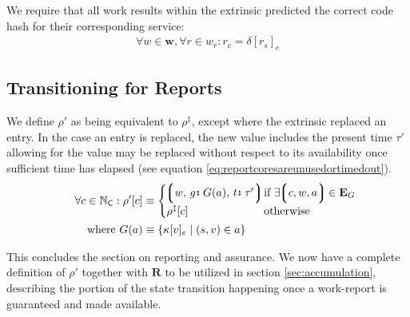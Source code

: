 We require that all work results within the extrinsic predicted the correct code hash for their corresponding service:
\begin{align}\label{eq:reportcodesarecorrect}
  \forall w \in \mathbf{w}, \forall r \in w_r : r_c = \delta[r_s]_c
\end{align}









\subsection{Transitioning for Reports}

We define $\rho'$ as being equivalent to $\rho^\ddagger$, except where the extrinsic replaced an entry. In the case an entry is replaced, the new value includes the present time $\tau'$ allowing for the value may be replaced without respect to its availability once sufficient time has elapsed (see equation \ref{eq:reportcoresareunusedortimedout}).
\begin{equation}
\begin{aligned}
    \forall c \in \N_\mathsf{C} : \rho'[c] &\equiv \begin{cases}
      \tup{w\ts\is{g}{G(a)}\ts\is{t}{\tau'}}\!\!\!\!\! &\when \exists \tup{c, w, a} \in \mathbf{E}_G \\
      \rho^\ddagger[c] &\otherwise
    \end{cases}\!\!\!\!\!\!\!\!\! \\
    \where G(a) &\equiv \{\kappa[v]_e \mid (s, v) \in a \}
\end{aligned}
\end{equation}

This concludes the section on reporting and assurance. We now have a complete definition of $\rho'$ together with $\mathbf{R}$ to be utilized in section \ref{sec:accumulation}, describing the portion of the state transition happening once a work-report is guaranteed and made available.
